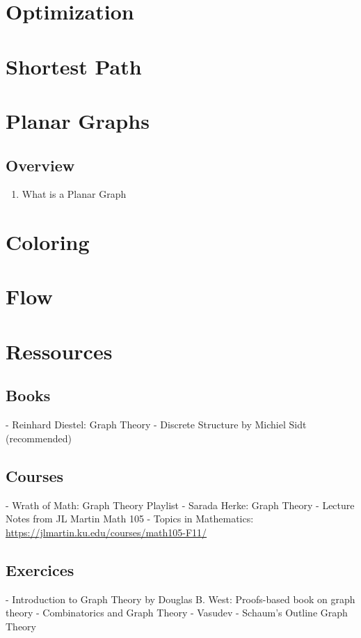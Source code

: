 \documentclass{article}
\begin{document}
\section{Optimization}
\section{Shortest Path}
\section{Planar Graphs}

\subsection{Overview}%
\label{sub:Overview}

\begin{enumerate}
    \item What is a Planar Graph
\end{enumerate}

\section{Coloring}
\section{Flow}

\section{Ressources}%
\label{sec:Ressources}

\subsection{Books}%
\label{sub:Books}

- Reinhard Diestel: Graph Theory
- Discrete Structure by Michiel Sidt (recommended)

\subsection{Courses}%
\label{sub:Courses}

- Wrath of Math: Graph Theory Playlist
- Sarada Herke: Graph Theory
- Lecture Notes from JL Martin Math 105 - Topics in Mathematics:
\url{https://jlmartin.ku.edu/courses/math105-F11/}

\subsection{Exercices}%
\label{sub:Exercices}

- Introduction to Graph Theory by Douglas B. West: Proofs-based book on
graph theory
- Combinatorics and Graph Theory - Vasudev
- Schaum's Outline Graph Theory
\end{document}
